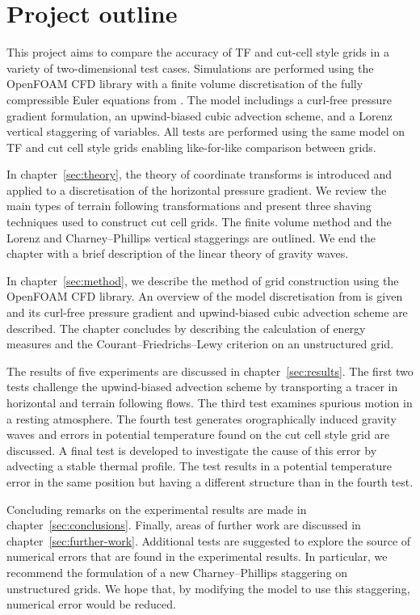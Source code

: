 \section{Project outline}
This project aims to compare the accuracy of TF and cut-cell style grids in a variety of two-dimensional test cases.   Simulations are performed using the OpenFOAM CFD library \autocite{openfoam} with a finite volume discretisation of the fully compressible Euler equations from \textcite{weller-shahrokhi2014}.  The model includings a curl-free pressure gradient formulation, an upwind-biased cubic advection scheme, and a Lorenz vertical staggering of variables.  All tests are performed using the same model on TF and cut cell style grids enabling like-for-like comparison between grids.

In chapter~\ref{sec:theory}, the theory of coordinate transforms is introduced and applied to a discretisation of the horizontal pressure gradient.  We review the main types of terrain following transformations and present three shaving techniques used to construct cut cell grids.  The finite volume method and the Lorenz and Charney--Phillips vertical staggerings are outlined.  We end the chapter with a brief description of the linear theory of gravity waves.

In chapter~\ref{sec:method}, we describe the method of grid construction using the OpenFOAM CFD library.  An overview of the model discretisation from \textcite{weller-shahrokhi2014} is given and its curl-free pressure gradient and upwind-biased cubic advection scheme are described.  The chapter concludes by describing the calculation of energy measures and the Courant--Friedrichs--Lewy criterion on an unstructured grid.

The results of five experiments are discussed in chapter~\ref{sec:results}.  The first two tests challenge the upwind-biased advection scheme by transporting a tracer in horizontal and terrain following flows.  The third test examines spurious motion in a resting atmosphere.  The fourth test generates orographically induced gravity waves and errors in potential temperature found on the cut cell style grid are discussed.  A final test is developed to investigate the cause of this error by advecting a stable thermal profile.  The test results in a potential temperature error in the same position but having a different structure than in the fourth test.

Concluding remarks on the experimental results are made in chapter~\ref{sec:conclusions}.  Finally, areas of further work are discussed in chapter~\ref{sec:further-work}.  Additional tests are suggested to explore the source of numerical errors that are found in the experimental results.  In particular, we recommend the formulation of a new Charney--Phillips staggering on unstructured grids.  We hope that, by modifying the model to use this staggering, numerical error would be reduced.
